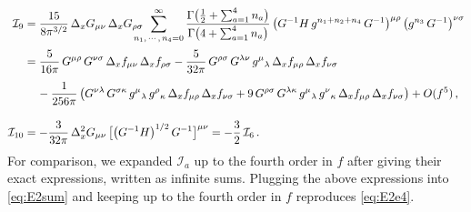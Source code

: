 \documentclass[11pt]{article}
\newcommand{\CI}{\mathcal{I}}
\begin{document}
\begin{align*}
	\CI_9 & = \frac{15}{8 \pi^{3/2}} \, \Delta_x G_{\mu\nu} \, \Delta_x G_{\rho\sigma}
		\!\!\!\!\!\! \sum_{n_1,\, \cdots,\, n_4 = 0}^\infty \frac{\Gamma\bigl( \frac{1}{2} + \sum_{a = 1}^4 n_a \bigr)}{\Gamma \bigl( 4 + \sum_{a = 1}^4 n_a \bigr)} \, \bigl( G^{-1} H \, g^{n_1 + n_2 + n_4} \, G^{-1} \bigr)^{\mu\rho} \, \bigl( g^{n_3} \, G^{-1} \bigr)^{\nu\sigma} \notag \\[2pt]
		& = \frac{5}{16\pi} \, G^{\mu\rho} \, G^{\nu\sigma} \, \Delta_{x} f_{\mu\nu} \, \Delta_{x} f_{\rho\sigma} - \frac{5}{32 \pi} \, G^{\rho\sigma} \, G^{\lambda\nu} \, g^\mu{}_\lambda \, \Delta_{x} f_{\mu\rho} \, \Delta_{x} f_{\nu\sigma} \notag \\[4pt]
		& \quad\hspace{0.5mm} - \frac{1}{256 \pi} \, \bigl( G^{\nu\lambda} \, G^{\sigma \kappa} \, g^\mu{}_\lambda \, g^\rho{}_\kappa \, \Delta_{x} f_{\mu\rho} \, \Delta_{x} f_{\nu\sigma} + 9 \, G^{\rho\sigma} \, G^{\lambda \kappa} \, g^\mu{}_\lambda \, g^\nu{}_\kappa \, \Delta_{x} f_{\mu\rho} \, \Delta_{x} f_{\nu\sigma} \bigr) + O (f^5)\,, \\[10pt]
	\CI_{10} & = - \frac{3}{32 \pi} \, \Delta_{x}^2 G_{\mu\nu} \, \bigl[ \bigl( G^{-1} H \bigr)^{1/2} \, G^{-1} \bigr]^{\mu\nu} = - \frac{3}{2} \, \CI_6\,. 
\end{align*}
%
For comparison, we expanded $\CI_a$ up to the fourth order in $f$ after giving their exact expressions, written as infinite sums. Plugging the above expressions into \eqref{eq:E2sum} and keeping up to the fourth order in $f$ reproduces \eqref{eq:E2e4}.

\newpage



\end{document}
